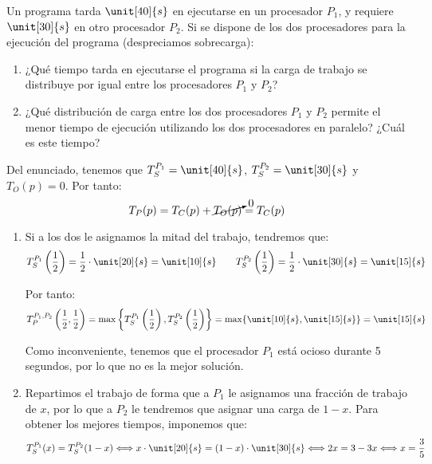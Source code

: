 \begin{ejercicio}
    Un programa tarda $\unit[40]{s}$ en ejecutarse en un procesador $P_1$, y requiere $\unit[30]{s}$ en otro procesador
    $P_2$. Si se dispone de los dos procesadores para la ejecución del programa (despreciamos sobrecarga):
    \begin{enumerate}
        \item ¿Qué tiempo tarda en ejecutarse el programa si la carga de trabajo se distribuye por igual entre los
        procesadores $P_1$ y $P_2$?
        \item ¿Qué distribución de carga entre los dos procesadores $P_1$ y $P_2$ permite el menor tiempo de
        ejecución utilizando los dos procesadores en paralelo? ¿Cuál es este tiempo?
    \end{enumerate}


    Del enunciado, tenemos que $T_S^{P_1} = \unit[40]{s}$, $T_S^{P_2} = \unit[30]{s}$ y $T_O(p) = 0$. Por tanto:
    \begin{equation*}
        T_P(p) = T_C(p) + \cancelto{0}{T_O(p)} = T_C(p)
    \end{equation*}

    \begin{enumerate}
        \item 
            Si a los dos le asignamos la mitad del trabajo, tendremos que:
            \begin{equation*}
                T_S^{P_1}\left(\frac{1}{2}\right) = \frac{1}{2}\cdot \unit[20]{s} = \unit[10]{s} \quad \quad T_S^{P_2}\left(\frac{1}{2}\right) = \frac{1}{2}\cdot \unit[30]{s} = \unit[15]{s}
            \end{equation*}
            
            Por tanto:
            \begin{equation*}
                T_P^{P_1, P_2}\left(\frac{1}{2}, \frac{1}{2}\right) = \max\left\{T_S^{P_1}\left(\frac{1}{2}\right), T_S^{P_2}\left(\frac{1}{2}\right)\right\} = \max\{\unit[10]{s}, \unit[15]{s}\} = \unit[15]{s}
            \end{equation*}

            Como inconveniente, tenemos que el procesador $P_1$ está ocioso durante 5 segundos, por lo que no es la mejor solución.

        \item 
        Repartimos el trabajo de forma que a $P_1$ le asignamos una fracción de trabajo de $x$, por lo que a $P_2$ le tendremos que asignar una carga de $1-x$. Para obtener los mejores tiempos, imponemos que:
        \begin{equation*}
            T_S^{P_1}(x) = T_S^{P_2}(1-x) \Longleftrightarrow
            x\cdot \unit[20]{s} = (1-x)\cdot \unit[30]{s} \Longleftrightarrow
            2x = 3-3x \Longleftrightarrow x = \frac{3}{5}
        \end{equation*}


\end{enumerate}
\end{ejercicio}
